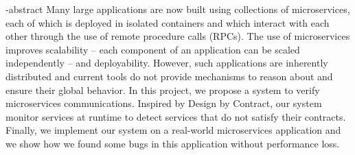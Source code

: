 
\en-abstract{
Many large applications are now built using collections of
microservices, each of which is deployed in isolated containers 
and which interact with each other through the use
of remote procedure calls (RPCs). The use of microservices
improves scalability – each component of an application can
be scaled independently – and deployability. However, such
applications are inherently distributed and current tools do not
provide mechanisms to reason about and ensure their global
behavior.
In this project, we propose a system to verify microservices communications.
Inspired by Design by Contract, our system monitor services at runtime to detect
services that do not satisfy their contracts. Finally, we implement our system on
a real-world microservices application and we show how we found some bugs in this application
without performance loss.
}
